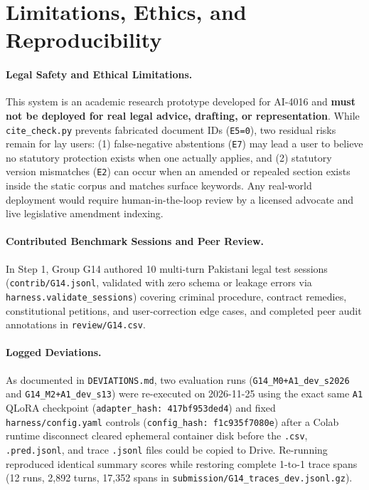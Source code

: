 \documentclass[11pt]{article}
\newcommand{\groupid}{G14}
\begin{document}
\section{Limitations, Ethics, and Reproducibility}
\label{sec:\groupid-ethics}

\paragraph{Legal Safety and Ethical Limitations.}
This system is an academic research prototype developed for AI-4016 and \textbf{must not be deployed for real legal advice, drafting, or representation}. While \texttt{cite\_check.py} prevents fabricated document IDs (\texttt{E5=0}), two residual risks remain for lay users: (1) false-negative abstentions (\texttt{E7}) may lead a user to believe no statutory protection exists when one actually applies, and (2) statutory version mismatches (\texttt{E2}) can occur when an amended or repealed section exists inside the static corpus and matches surface keywords. Any real-world deployment would require human-in-the-loop review by a licensed advocate and live legislative amendment indexing.

\paragraph{Contributed Benchmark Sessions and Peer Review.}
In Step 1, Group \groupid{} authored 10 multi-turn Pakistani legal test sessions (\texttt{contrib/G14.jsonl}, validated with zero schema or leakage errors via \texttt{harness.validate\_sessions}) covering criminal procedure, contract remedies, constitutional petitions, and user-correction edge cases, and completed peer audit annotations in \texttt{review/G14.csv}.

\paragraph{Logged Deviations.}
As documented in \texttt{DEVIATIONS.md}, two evaluation runs (\texttt{G14\_M0+A1\_dev\_s2026} and \texttt{G14\_M2+A1\_dev\_s13}) were re-executed on 2026-11-25 using the exact same \texttt{A1} QLoRA checkpoint (\texttt{adapter\_hash: 417bf953ded4}) and fixed \texttt{harness/config.yaml} controls (\texttt{config\_hash: f1c935f7080e}) after a Colab runtime disconnect cleared ephemeral container disk before the \texttt{.csv}, \texttt{.pred.jsonl}, and trace \texttt{.jsonl} files could be copied to Drive. Re-running reproduced identical summary scores while restoring complete 1-to-1 trace spans (12 runs, 2,892 turns, 17,352 spans in \texttt{submission/G14\_traces\_dev.jsonl.gz}).
\end{document}

